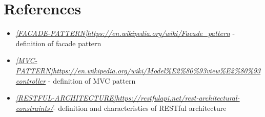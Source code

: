 \documentclass[a4paper]{report}
\begin{document}
\chapter{References}

\begin{itemize}
\item \label{ref:facade-pattern} \hyperref[use:facade-pattern]{\textit{[FACADE-PATTERN]}}\href{https://en.wikipedia.org/wiki/Facade\_pattern}{\textit{https://en.wikipedia.org/wiki/Facade\_pattern}} - definition of facade pattern
\item \label{ref:MVC-pattern} \hyperref[use:MVC-pattern]{\textit{[MVC-PATTERN]}}\href{https://en.wikipedia.org/wiki/Model\%E2\%80\%93view\%E2\%80\%93controller}{\textit{https://en.wikipedia.org/wiki/Model\%E2\%80\%93view\%E2\%80\%93controller}} - definition of MVC pattern
\item \label{ref:RESTful-architecture} \hyperref[use:RESTful-architecture]{\textit{[RESTFUL-ARCHITECTURE]}}\href{https://restfulapi.net/rest-architectural-constraints/}{\textit{https://restfulapi.net/rest-architectural-constraints/}}- definition and characteristics of RESTful architecture
\end{itemize}
\end{document}
